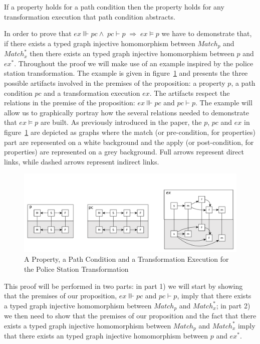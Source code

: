 \begin{lemma}{If a property holds for a path condition then the property holds for any transformation execution that path condition abstracts.}
\label{lemma:validity1}
\end{lemma}
\begin{pf}
In order to prove that $ex\Vvdash pc
\land\; pc\vdash p \;\Longrightarrow \; ex\models p$ we have to demonstrate that, if there
exists a typed graph injective homomorphism between $Match_p$ and
$Match^{*}_{x}$ then there exists an typed graph injective homomorphism between
$p$ and $ex^*$. Throughout the proof we will make use of an example inspired by
the police station transformation. The example is given in
figure~\ref{fig:proof_example} and presents the three possible artifacts
involved in the premises of the proposition: a property $p$, a path condition
$pc$ and a transformation execution $ex$. The artifacts respect the relations in
the premise of the proposition: $ex\Vvdash pc$ and $pc\vdash p$. The example
will allow us to graphically portray how the several relations needed to
demonstrate that $ex\models p$ are built. As previously introduced in the paper,
the $p$, $pc$ and $ex$ in figure~\ref{fig:proof_example} are depicted as graphs
where the match (or pre-condition, for properties) part are represented on a
white background and the apply (or post-condition, for properties) are
represented on a grey background. Full arrows represent direct links, while
dashed arrows represent indirect links.

\begin{figure}[h!] \centering \includegraphics[scale=.35]{./figures/property_proving/proof_example.pdf}
	\caption{A Property, a Path Condition and a Transformation Execution for the Police Station Transformation}
	\label{fig:proof_example}
\end{figure}

This proof will be performed in two parts: in part 1) we will start by showing that the
premises of our proposition, $ex\Vvdash pc$ and $pc\vdash p$, imply that there
exists a typed graph injective homomorphism between $Match_p$ and
$Match^{*}_{x}$\;; in part 2) we then need to show that the premises of our proposition
and the fact that there exists a typed graph injective homomorphism between
$Match_p$ and $Match^{*}_{x}$ imply that there exists an typed graph injective
homomorphism between $p$ and $ex^*$.


\end{pf}
